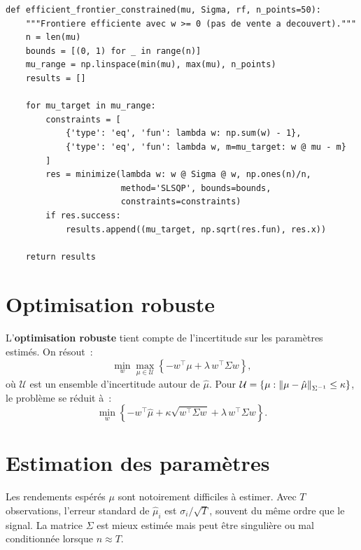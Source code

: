 \begin{codeblock}[title=\textbf{Optimisation avec contraintes}]
\begin{verbatim}
def efficient_frontier_constrained(mu, Sigma, rf, n_points=50):
    """Frontiere efficiente avec w >= 0 (pas de vente a decouvert)."""
    n = len(mu)
    bounds = [(0, 1) for _ in range(n)]
    mu_range = np.linspace(min(mu), max(mu), n_points)
    results = []

    for mu_target in mu_range:
        constraints = [
            {'type': 'eq', 'fun': lambda w: np.sum(w) - 1},
            {'type': 'eq', 'fun': lambda w, m=mu_target: w @ mu - m}
        ]
        res = minimize(lambda w: w @ Sigma @ w, np.ones(n)/n,
                       method='SLSQP', bounds=bounds,
                       constraints=constraints)
        if res.success:
            results.append((mu_target, np.sqrt(res.fun), res.x))

    return results
\end{verbatim}
\end{codeblock}

\section{Optimisation robuste}

\begin{definition}
L'\textbf{optimisation robuste} tient compte de l'incertitude sur les
param\`etres estim\'es. On r\'esout~:
\[
    \min_w \max_{\mu \in \mathcal{U}} \left\{-w^\top\mu
    + \lambda\,w^\top\Sigma w\right\},
\]
o\`u $\mathcal{U}$ est un ensemble d'incertitude autour de $\hat{\mu}$.
Pour $\mathcal{U} = \{\mu : \left\| \mu - \hat{\mu} \right\|_{\Sigma^{-1}} \leq \kappa\}$,
le probl\`eme se r\'eduit \`a~:
\[
    \min_w \left\{-w^\top\hat{\mu} + \kappa\sqrt{w^\top\Sigma w}
    + \lambda\,w^\top\Sigma w\right\}.
\]
\end{definition}

\section{Estimation des param\`etres}

\begin{attention}[title=\textbf{Erreurs d'estimation}]
Les rendements esp\'er\'es $\mu$ sont notoirement difficiles \`a estimer.
Avec $T$ observations, l'erreur standard de $\hat{\mu}_i$ est
$\sigma_i/\sqrt{T}$, souvent du m\^eme ordre que le signal.
La matrice $\Sigma$ est mieux estim\'ee mais peut \^etre singuli\`ere
ou mal conditionn\'ee lorsque $n \approx T$.
\end{attention}

